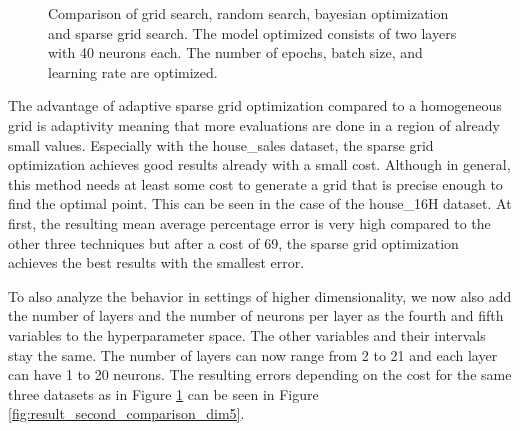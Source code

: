 \begin{figure}[H]
	\caption{ Comparison of grid search, random search, bayesian optimization and sparse grid search. The model optimized consists of two layers with 40 neurons each. The number of epochs, batch size, and learning rate are optimized.  }	
	\label{fig:result_second_comparison_dim3}
\end{figure}


The advantage of adaptive sparse grid optimization compared to a homogeneous grid is adaptivity meaning that more evaluations are done in a region of already small values. Especially with the house\_sales dataset, the sparse grid optimization achieves good results already with a small cost. Although in general, this method needs at least some cost to generate a grid that is precise enough to find the optimal point. This can be seen in the case of the house\_16H dataset. At first, the resulting mean average percentage error is very high compared to the other three techniques but after a cost of 69, the sparse grid optimization achieves the best results with the smallest error. \newline 

To also analyze the behavior in settings of higher dimensionality, we now also add the number of layers and the number of neurons per layer as the fourth and fifth variables to the hyperparameter space. The other variables and their intervals stay the same. The number of layers can now range from 2 to 21 and each layer can have 1 to 20 neurons. The resulting errors depending on the cost for the same three datasets as in Figure \ref{fig:result_second_comparison_dim3} can be seen in Figure \ref{fig:result_second_comparison_dim5}.


